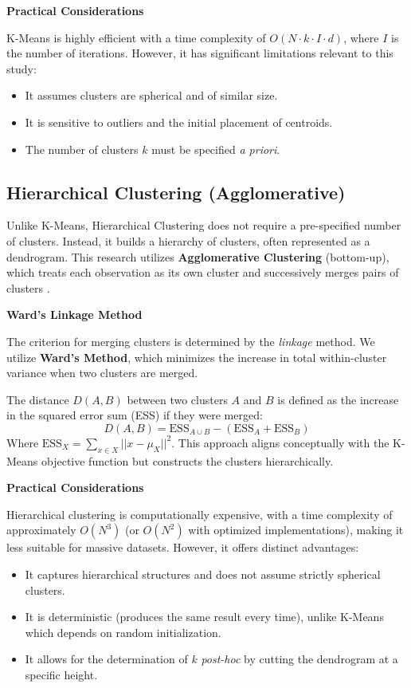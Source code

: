 \textbf{Practical Considerations}

K-Means is highly efficient with a time complexity of $O(N \cdot k \cdot I \cdot d)$, where $I$ is the number of iterations. However, it has significant limitations relevant to this study:
\begin{itemize}
  \item It assumes clusters are spherical and of similar size.
  \item It is sensitive to outliers and the initial placement of centroids.
  \item The number of clusters $k$ must be specified \textit{a priori}.
\end{itemize}

\subsection{Hierarchical Clustering (Agglomerative)}
Unlike K-Means, Hierarchical Clustering does not require a pre-specified number of clusters. Instead, it builds a hierarchy of clusters, often represented as a dendrogram. This research utilizes \textbf{Agglomerative Clustering} (bottom-up), which treats each observation as its own cluster and successively merges pairs of clusters \cite{ward1963}.

\textbf{Ward's Linkage Method}

The criterion for merging clusters is determined by the \textit{linkage} method. We utilize \textbf{Ward's Method}, which minimizes the increase in total within-cluster variance when two clusters are merged.

The distance $D(A, B)$ between two clusters $A$ and $B$ is defined as the increase in the squared error sum (ESS) if they were merged:
\begin{equation}
  D(A, B) = \text{ESS}_{A \cup B} - (\text{ESS}_A + \text{ESS}_B)
\end{equation}
Where $\text{ESS}_X = \sum_{x \in X} ||x - \mu_X||^2$. This approach aligns conceptually with the K-Means objective function but constructs the clusters hierarchically.

\textbf{Practical Considerations}

Hierarchical clustering is computationally expensive, with a time complexity of approximately $O(N^3)$ (or $O(N^2)$ with optimized implementations), making it less suitable for massive datasets. However, it offers distinct advantages:
\begin{itemize}
  \item It captures hierarchical structures and does not assume strictly spherical clusters.
  \item It is deterministic (produces the same result every time), unlike K-Means which depends on random initialization.
  \item It allows for the determination of $k$ \textit{post-hoc} by cutting the dendrogram at a specific height.
\end{itemize}


